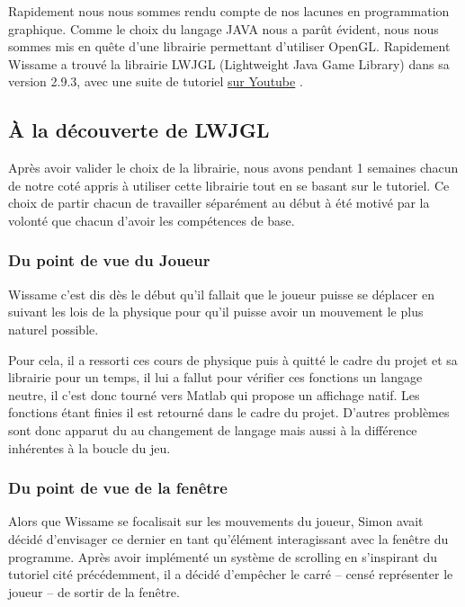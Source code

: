 \documentclass[french,12pt]{article}
\begin{document}
Rapidement nous nous sommes rendu compte de nos lacunes en programmation graphique. Comme le choix du langage JAVA nous a parût évident, nous nous sommes mis en quête d'une librairie permettant d'utiliser OpenGL. Rapidement Wissame a trouvé la librairie LWJGL (Lightweight Java Game Library) dans sa version 2.9.3, avec une suite de tutoriel \href{https://www.youtube.com/watch?v=o56B1O1WwBk&list=PLq0CkcZATy27MgFJcy0HmMPVRwtDWeMlD}{sur Youtube}  .


\subsection{À la découverte de LWJGL}

Après avoir valider le choix de la librairie, nous avons pendant 1 semaines chacun de notre coté appris à utiliser cette librairie tout en se basant sur le tutoriel. Ce choix de partir chacun de travailler séparément au début à été motivé par la volonté que chacun d'avoir les compétences de base.

\subsubsection{Du point de vue du Joueur}

Wissame c'est dis dès le début qu'il fallait que le joueur puisse se déplacer en suivant les lois de la physique pour qu'il puisse avoir un mouvement le plus naturel possible.

Pour cela, il a ressorti ces cours de physique puis à quitté le cadre du projet et sa librairie pour un temps, il lui a fallut pour vérifier ces fonctions un langage neutre, il c'est donc tourné vers Matlab qui propose un affichage natif. Les fonctions étant finies il est retourné dans le cadre du projet. D'autres problèmes sont donc apparut du au changement de langage mais aussi à la différence inhérentes à la boucle du jeu.

\subsubsection{Du point de vue de la fenêtre}

Alors que Wissame se focalisait sur les mouvements du joueur, Simon avait décidé d'envisager ce dernier en tant qu'élément interagissant avec la fenêtre du programme. Après avoir implémenté un système de scrolling en s'inspirant du tutoriel cité précédemment, il a décidé d'empêcher le carré – censé représenter le joueur – de sortir de la fenêtre.
\end{document}
